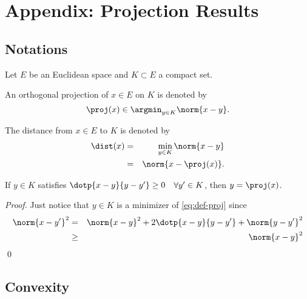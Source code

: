 \section{Appendix: Projection Results}
\label{sec:app-proj}



\subsection{Notations}

Let $E$ be an Euclidean space and $K\subset E$ a compact set.

\begin{definition}
  An orthogonal projection of $x\in E$ on $K$ is denoted by
  \begin{equation}
    \label{eq:def-proj}
    \proj(x) \in \argmin_{y\in K} \norm{x-y}.
  \end{equation}
\end{definition}

\begin{definition}
  The distance from $x\in E$ to $K$ is denoted by
  \begin{eqnarray}
    \dist(x)
      &=& \min_{y\in K} \norm{x-y}    \label{eq:def-dist-min} \\
      &=& \norm{x-\proj (x)}          \label{eq:def-dist-proj}.
  \end{eqnarray}
\end{definition}

\begin{proposition}
  If $y\in K$ satisfies $\dotp{x-y}{y-y'} \geq 0 \quad\forall y'\in K$,
  then $y = \proj(x)$.
\end{proposition}

\begin{proof}
  Just notice that $y\in K$ is a minimizer of \eqref{eq:def-proj} since
  \begin{eqnarray*}
    \norm{x-y'}^2
      & =   & \norm{x-y}^2 + 2 \dotp{x-y}{y-y'} + \norm{y-y'}^2 \\
      &\geq & \norm{x-y}^2
  \end{eqnarray*}
  \qed
\end{proof}


\subsection{Convexity}

